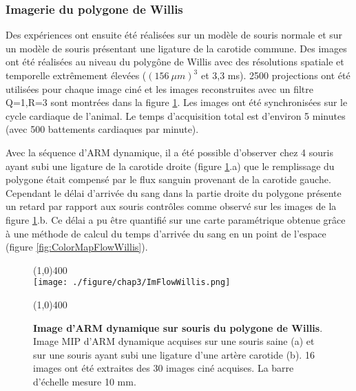 \subsubsection{Imagerie du polygone de Willis}


Des expériences ont ensuite été réalisées sur un modèle de souris normale et sur un modèle de souris présentant une ligature de la carotide commune. Des images ont été réalisées au niveau du polygône de Willis avec des résolutions spatiale et temporelle extrêmement élevées ($(156 \ \mu m)^3$ et 3,3 ms). 2500 projections ont été utilisées pour chaque image ciné et les images reconstruites avec un filtre Q=1,R=3 sont montrées dans la figure \ref{fig:ImFlowWillis}. Les images ont été synchronisées sur le cycle cardiaque de l'animal. Le temps d'acquisition total est d'environ 5 minutes (avec 500 battements cardiaques par minute).

Avec la séquence d'ARM dynamique, il a été possible d'observer chez 4 souris ayant subi une ligature de la carotide droite (figure \ref{fig:ImFlowWillis}.a) que le remplissage du polygone était compensé par le flux sanguin provenant de la carotide gauche. Cependant le délai d'arrivée du sang dans la partie droite du polygone présente un retard par rapport aux souris contrôles comme observé sur les images de la figure \ref{fig:ImFlowWillis}.b.
Ce délai a pu être quantifié sur une carte paramétrique obtenue grâce à une méthode de calcul du temps d'arrivée du sang en un point de l'espace (figure \ref{fig:ColorMapFlowWillis}).

\begin{figure}[H]
\centering \line(1,0){400} \\
\texttt{[image: ./figure/chap3/ImFlowWillis.png]}
\caption[Image d'ARM dynamique sur souris du polygone de Willis.]{\label{fig:ImFlowWillis} \textbf{Image d'ARM dynamique sur souris du polygone de Willis}. Image MIP d'ARM dynamique acquises sur une souris saine (a) et sur une souris ayant subi une ligature d'une artère carotide (b). 16 images ont été extraites des 30 images ciné acquises. La barre d'échelle mesure 10 mm.}
\line(1,0){400} \\ \end{figure}

